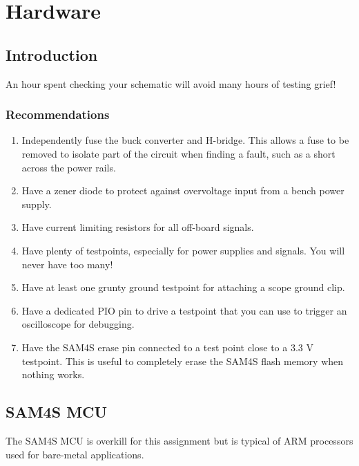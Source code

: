 \chapter{Hardware}


\section{Introduction}\label{introduction}

An hour spent checking your schematic will avoid many hours of testing
grief!

\subsection{Recommendations}\label{recommendations}

\begin{enumerate}
\item
  Independently fuse the buck converter and H-bridge. This allows a fuse
  to be removed to isolate part of the circuit when finding a fault,
  such as a short across the power rails.

\item
  Have a zener diode to protect against overvoltage input from a bench
  power supply.

\item
  Have current limiting resistors for all off-board signals.

\item
  Have plenty of testpoints, especially for power supplies and signals.
  You will never have too many!

\item
  Have at least one grunty ground testpoint for attaching a scope ground
  clip.

\item
  Have a dedicated PIO pin to drive a testpoint that you can use to
  trigger an oscilloscope for debugging.

\item
  Have the SAM4S erase pin connected to a test point close to a 3.3 V
  testpoint. This is useful to completely erase the SAM4S flash memory
  when nothing works.
\end{enumerate}

\section{SAM4S MCU}\label{sam4s-mcu}

The SAM4S MCU is overkill for this assignment but is typical of
ARM processors used for bare-metal applications.

